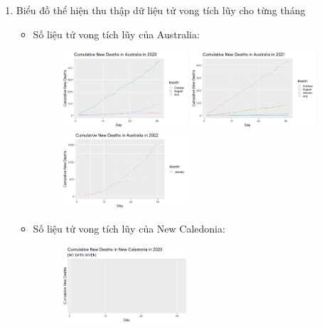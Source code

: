 \documentclass[a4paper]{article}
\theoremstyle{definition}
\begin{document}
\begin{enumerate}[i)]
\begin{enumerate}[1]
    \item Biểu đồ thể hiện thu thập dữ liệu tử vong tích lũy cho từng tháng
     \begin{itemize}
    \item{Số liệu tử vong tích lũy của Australia:}\\ 
     \begin{figure}[htp!]
    \includegraphics[width=0.47\textwidth]{Images/8.1v.png}
    \includegraphics[width=0.47\textwidth]{Images/8.2v.png}
    \includegraphics[width=0.47\textwidth]{Images/8.3v.png}
    \end{figure}
    \end{itemize}
    \pagebreak
    \begin{itemize}
    \item{Số liệu tử vong tích lũy của New Caledonia:}\\ 
     \begin{figure}[htp!]
    \includegraphics[width=0.47\textwidth]{Images/8.4v.png}

\end{figure}
\end{itemize}
\end{enumerate}
\end{enumerate}
\end{document}
